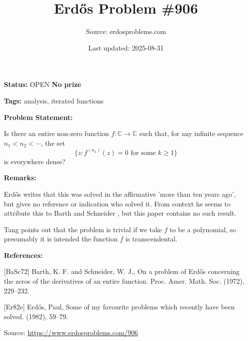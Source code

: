 \documentclass{article}
\title{Erd\H{o}s Problem \#906}
\date{Last updated: 2025-08-31}
\author{Source: erdosproblems.com}
\begin{document}
\maketitle

\noindent\textbf{Status:} OPEN \quad \textbf{No prize}

\noindent\textbf{Tags:} analysis, iterated functions

\medskip
\noindent\textbf{Problem Statement:}

Is there an entire non-zero function $f:\mathbb{C}\to \mathbb{C}$ such that, for any infinite sequence $n_1<n_2<\cdots$, the set\[\{ z: f^{(n_k)}(z)=0 \textrm{ for some }k\geq 1\}\]is everywhere dense?

\bigskip
\noindent\textbf{Remarks:}

Erd\H{o}s \cite{Er82e} writes that this was solved in the affirmative 'more than ten years ago', but gives no reference or indication who solved it. From context he seems to attribute this to Barth and Schneider \cite{BaSc72}, but this paper contains no such result.

Tang points out that the problem is trivial if we take $f$ to be a polynomial, so presumably it is intended the function $f$ is transcendental.

\bigskip
\noindent\textbf{References:}

[BaSc72] Barth, K. F. and Schneider, W. J., On a problem of Erd\H{o}s concerning the zeros of the
derivatives of an entire function. Proc. Amer. Math. Soc. (1972), 229--232.
 
 [Er82e] Erd\H{o}s, Paul, Some of my favourite problems which recently have been solved. (1982), 59--79.

\bigskip
\noindent\small{Source: \url{https://www.erdosproblems.com/906}}
\end{document}
